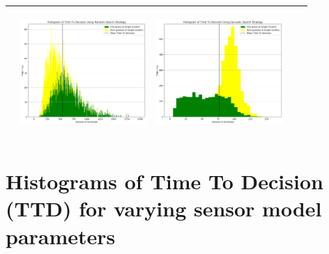 \begin{landscape}
\begin{table}[h!]
\begin{tabular}{ | c | c | c | c | c |}
\begin{minipage}[c][48mm][c]{48mm}
    \end{minipage}
    &
    \begin{minipage}[c][48mm][c]{48mm}
      \includegraphics[width=48mm, height=48mm]{Chapters/MultiAgentTargetDetection/Figs/Histograms/VaryingInitBelief/25/25RandomHistogram.png}
    \end{minipage}
    &
    \begin{minipage}[c][48mm][c]{48mm}
      \includegraphics[width=48mm, height=48mm]{Chapters/MultiAgentTargetDetection/Figs/Histograms/VaryingInitBelief/25/25SaccadicHistogram.png}
    \end{minipage}
    \\
    \hline
   
  \end{tabular}
  \label{table:HistVaryingCumulativeInitial}
\end{table}
\break




\vspace*{\fill}
\section{Histograms of Time To Decision (TTD) for varying sensor model parameters}


\end{landscape}
